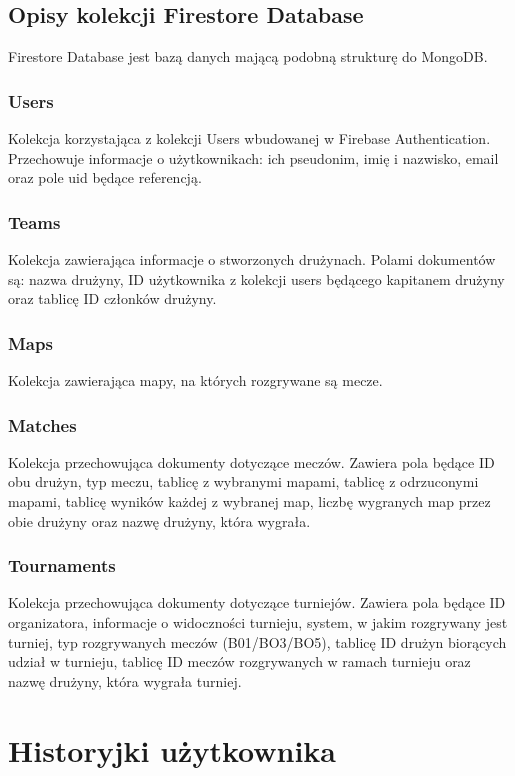\documentclass[shortabstract]{iithesis}
\theoremstyle{definition} \newtheorem{definition}{Definicja}[]
\theoremstyle{remark} \newtheorem{remark}[definition]{Observation}
\theoremstyle{plain} \newtheorem{theorem}[definition]{Theorem}
\theoremstyle{plain} \newtheorem{lemma}[definition]{Lemma}
\begin{document}
\section{Opisy kolekcji Firestore Database}
Firestore Database jest bazą danych mającą podobną strukturę do MongoDB.

\subsection{Users}
Kolekcja korzystająca z kolekcji Users wbudowanej w Firebase Authentication. Przechowuje informacje o użytkownikach: ich pseudonim, imię i nazwisko, email oraz pole uid będące referencją.

\subsection{Teams}
Kolekcja zawierająca informacje o stworzonych drużynach. Polami dokumentów są: nazwa drużyny, ID użytkownika z kolekcji users będącego kapitanem drużyny oraz tablicę ID członków drużyny.

\subsection{Maps}
Kolekcja zawierająca mapy, na których rozgrywane są mecze.

\subsection{Matches}
Kolekcja przechowująca dokumenty dotyczące meczów. Zawiera pola będące ID obu drużyn, typ meczu, tablicę z wybranymi mapami, tablicę z odrzuconymi mapami, tablicę wyników każdej z wybranej map, liczbę wygranych map przez obie drużyny oraz nazwę drużyny, która wygrała.

\subsection{Tournaments}
Kolekcja przechowująca dokumenty dotyczące turniejów. Zawiera pola będące ID organizatora, informacje o widoczności turnieju, system, w jakim rozgrywany jest turniej, typ rozgrywanych meczów (B01/BO3/BO5), tablicę ID drużyn biorących udział w turnieju, tablicę ID meczów rozgrywanych w ramach turnieju oraz nazwę drużyny, która wygrała turniej.

\chapter{Historyjki użytkownika}
\end{document}
